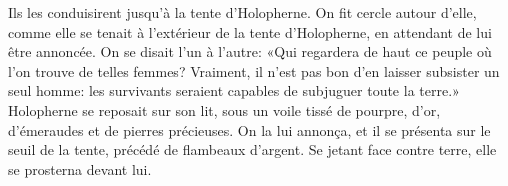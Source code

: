 Ils les conduisirent jusqu'à la tente d'Holopherne.
On fit cercle autour d'elle, comme elle se tenait à l'extérieur de la tente d'Holopherne,
	en attendant de lui être annoncée.
On se disait l'un à l'autre:
	«Qui regardera de haut ce peuple où l'on trouve de telles femmes?
Vraiment, il n'est pas bon d'en laisser subsister un seul homme:
	les survivants seraient capables de subjuguer toute la terre.»
Holopherne se reposait sur son lit,
	sous un voile tissé de pourpre, d'or, d'émeraudes et de pierres précieuses.
On la lui annonça,
	et il se présenta sur le seuil de la tente, précédé de flambeaux d'argent.
Se jetant face contre terre, elle se prosterna devant lui.
